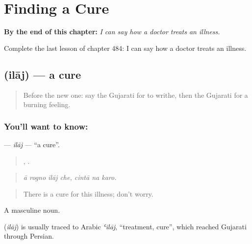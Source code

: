 
\chapter{Finding a Cure}
\label{ch:gu-finding-a-cure}

\begin{chapteropening}
\textbf{By the end of this chapter:} \emph{I can say how a doctor treats an illness.}

Complete the last lesson of chapter 484: I can say how a doctor treats an illness.
\end{chapteropening}

\section[\texorpdfstring{\gu{ઇલાજ} (ilāj)}{ઇલાજ (ilāj)}]{ (ilāj) — a cure}

\label{lesson:GU-C484-ilaj}



\begin{quote}
Before the new one: say the Gujarati for to writhe, then the Gujarati for a burning feeling.
\end{quote}

\subsection*{You'll want to know: }
\textbf{} — \emph{ilāj} — \textquotedblleft{}a cure\textquotedblright{}.

\begin{quote}
   ,   .
\end{quote}

\begin{quote}
\emph{ā rogno ilāj che, cintā na karo.}
\end{quote}

\begin{quote}
There is a cure for this illness; don't worry.
\end{quote}

A masculine noun.

\begin{cousinweb}
\textbf{} (\emph{ilāj}) is usually traced to Arabic \emph{ʿilāj}, \textquotedblleft{}treatment, cure\textquotedblright{}, which reached Gujarati through Persian.
\end{cousinweb}

